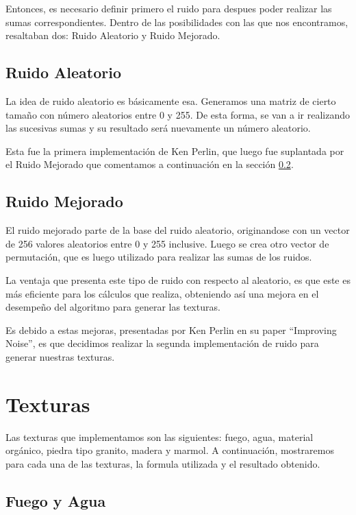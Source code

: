 \documentclass[a4paper,10pt]{article}
\begin{document}
Entonces, es necesario definir primero el ruido para despues poder realizar las
sumas correspondientes.  Dentro de las posibilidades con las que nos
encontramos, resaltaban dos: Ruido Aleatorio y Ruido Mejorado.

\subsection{Ruido Aleatorio}

La idea de ruido aleatorio es básicamente esa.  Generamos una matriz de cierto
tamaño con número aleatorios entre 0 y 255.  De esta forma, se van a ir
realizando las sucesivas sumas y su resultado será nuevamente un número
aleatorio.

Esta fue la primera implementación de Ken Perlin, que luego fue suplantada por
el Ruido Mejorado que comentamos a continuación en la sección \ref{improved}.

\subsection{Ruido Mejorado}
\label{improved}

El ruido mejorado parte de la base del ruido aleatorio, originandose con un
vector de 256 valores aleatorios entre 0 y 255 inclusive.  Luego se crea otro
vector de permutación, que es luego utilizado para realizar las sumas de los
ruidos.

La ventaja que presenta este tipo de ruido con respecto al aleatorio, es que
este es más eficiente para los cálculos que realiza, obteniendo así una mejora
en el desempeño del algoritmo para generar las texturas.

Es debido a estas mejoras, presentadas por Ken Perlin en su paper ``Improving
Noise'', es que decidimos realizar la segunda implementación de ruido para
generar nuestras texturas.


\section{Texturas}
\label{texturas}

Las texturas que implementamos son las siguientes: fuego, agua, material
orgánico, piedra tipo granito, madera y marmol.  A continuación, mostraremos
para cada una de las texturas, la formula utilizada y el resultado obtenido.

\subsection{Fuego y Agua}
\end{document}
